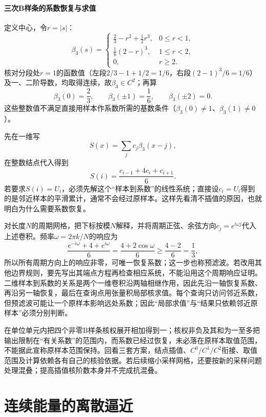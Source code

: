 \paragraph{三次B样条的系数恢复与求值}

定义中心，令$r=|s|$：
\[
  \beta_3(s)=
  \begin{cases}
    \frac23-r^2+\frac12r^3,&0\le r<1,\\
    \frac16(2-r)^3,&1\le r<2,\\
    0,&r\ge2.
  \end{cases}
\]
核对分段处$r=1$的函数值（左段$2/3-1+1/2=1/6$，右段$(2-1)^3/6=1/6$）及一、二阶导数，均取得连续，故$\beta_3\in C^2$；再算
\[
  \beta_3(0)=\frac23,\qquad \beta_3(\pm1)=\frac16,\qquad \beta_3(\pm2)=0.
\]
这些整数值不满足直接用样本作系数所需的基数条件（$\beta_3(0)\ne1$、$\beta_3(1)\ne0$）。

先在一维写
\[
  S(x)=\sum_jc_j\beta_3(x-j),
\]
在整数结点代入得到
\begin{equation}
  S(i)=\frac{c_{i-1}+4c_i+c_{i+1}}6.
  \label{eq:functional-cubic-bspline-prefilter}
\end{equation}
若要求$S(i)=U_i$，必须先解这个“样本到系数”的线性系统；直接设$c_i=U_i$得到的是邻近样本的平滑累计，通常不会经过原样本。这样先看清不插值的原因，也就明白为什么需要系数恢复。

对长度$N$的周期网格，把下标按模$N$解释，并将周期正弦、余弦方向$c_j=e^{i\omega j}$代入上述卷积。频率$\omega=2\pi k/N$的响应为
\[
  \frac{e^{-i\omega}+4+e^{i\omega}}6=\frac{4+2\cos\omega}{6}\ge\frac{4-2}{6}=\frac13,
\]
所以所有周期方向上的响应非零，可唯一恢复系数；这一步也称预滤波。若改用其他边界规则，要先写出其端点方程再检查相应系统，不能沿用这个周期响应证明。二维样本到系数的关系是两个一维卷积沿两轴相继作用，因此先沿一轴恢复系数、再沿另一轴恢复，最后在查询点用张量积局部核求值。每个查询只访问邻近系数，但预滤波可能让一个原样本影响远处系数；因此“局部求值”与“结果只依赖邻近原样本”必须分别判断。

在单位单元内把四个非零B样条核权展开相加得到一；核权非负及其和为一至多把输出限制在“有关系数”的范围内，而系数已经过恢复，未必落在原样本取值范围，不能据此宣称原样本范围保持。回看三套方案，结点插值、$C^0/C^1/C^2$衔接、取值范围及计算依赖各有自己的核验依据。若后续缩小采样网格，还要按新的采样问题处理混叠；提高插值核阶数本身并不完成抗混叠。

\section{连续能量的离散逼近}
\label{sec:discrete-energy-approximation}

